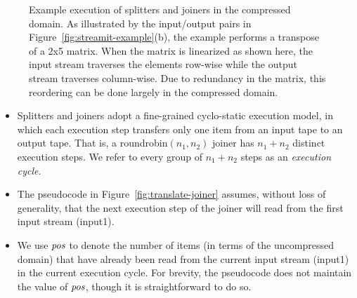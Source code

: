 \begin{figure*}[t]
\caption[Example execution of splitters and joiners in the compressed
  domain]{Example execution of splitters and joiners in the compressed
  domain.  As illustrated by the input/output pairs in
  Figure~\ref{fig:streamit-example}(b), the example performs a
  transpose of a 2x5 matrix.  When the matrix is linearized as shown
  here, the input stream traverses the elements row-wise while the
  output stream traverses column-wise.  Due to redundancy in the
  matrix, this reordering can be done largely in the compressed
  domain.  \protect\label{fig:sj-example}}
\end{figure*}

\begin{itemize}

\item Splitters and joiners adopt a fine-grained cyclo-static
  execution model, in which each execution step transfers only one
  item from an input tape to an output tape.  That is, a
  roundrobin$(n_1, n_2)$ joiner has $n_1 + n_2$ distinct execution
  steps.  We refer to every group of $n_1 + n_2$ steps as an {\it
    execution cycle}.

\item The pseudocode in Figure~\ref{fig:translate-joiner} assumes,
  without loss of generality, that the next execution step of the
  joiner will read from the first input stream (input1).

\item We use $\mbox{\it pos}$ to denote the number of items (in terms of the
  uncompressed domain) that have already been read from the current
  input stream (input1) in the current execution cycle.  For brevity,
  the pseudocode does not maintain the value of $\mbox{\it pos}$, though it is
  straightforward to do so.

\end{itemize}

